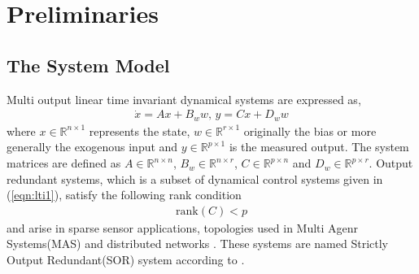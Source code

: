 \section{Preliminaries}
\subsection{The System Model}
Multi output linear time invariant dynamical systems are expressed as,
\begin{gather} 
    \dot{x}=A x+B_w w,\,y=C x+D_w w\label{eqn:lti1}
\end{gather}
where $x\in\mathbb{R}^{n\times 1}$ represents the state, $w\in\mathbb{R}^{r\times 1}$ originally the bias or more generally the exogenous input and $y\in\mathbb{R}^{p\times 1}$ is the measured output. The system matrices are defined as $A\in\mathbb{R}^{n\times n}$, $B_w\in\mathbb{R}^{n\times r}$, $C\in\mathbb{R}^{p\times n}$ and $D_w\in\mathbb{R}^{p\times r}$. Output redundant systems, which is a subset of dynamical control systems given in (\ref{eqn:lti1}), satisfy the following rank condition
\begin{gather}
    \mathrm{rank}(C)<p\label{eqn:rank_cond_sor}
\end{gather}
and arise in sparse sensor applications\cite{shoukry2015event}, topologies used in Multi Agenr Systems(MAS)\cite{olfati2007consensus} and distributed networks \cite{yang2022sensor}. These systems are named Strictly Output Redundant(SOR) system according to \cite{yang2025output}. 
